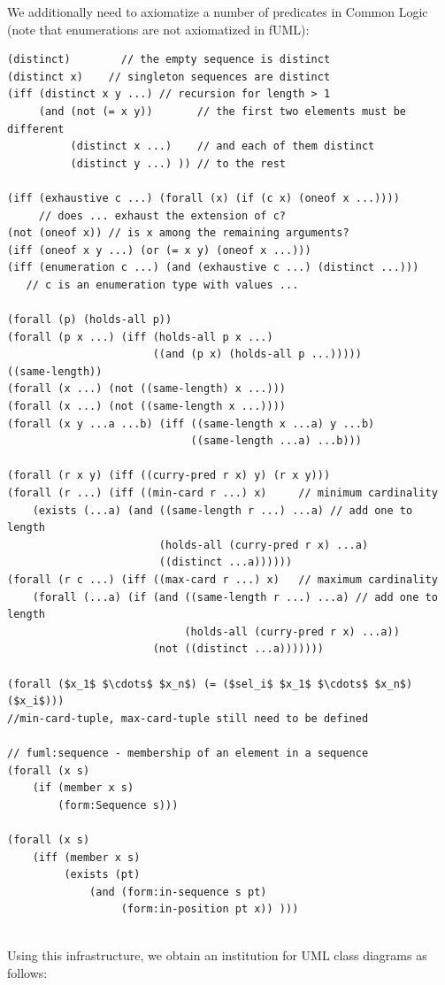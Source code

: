 \documentclass[10pt,fleqn,%
\ifpretendfinal
final%
\else
draft%
\fi,
]{scrreprt}
\begin{document}
We additionally need to axiomatize a number of predicates in Common Logic
(note that enumerations are not axiomatized in fUML):
\begin{lstlisting}[language=clif]
(distinct)        // the empty sequence is distinct
(distinct x)    // singleton sequences are distinct
(iff (distinct x y ...) // recursion for length > 1
     (and (not (= x y))       // the first two elements must be different
          (distinct x ...)    // and each of them distinct
          (distinct y ...) )) // to the rest

(iff (exhaustive c ...) (forall (x) (if (c x) (oneof x ...))))
     // does ... exhaust the extension of c?
(not (oneof x)) // is x among the remaining arguments?
(iff (oneof x y ...) (or (= x y) (oneof x ...)))
(iff (enumeration c ...) (and (exhaustive c ...) (distinct ...)))
   // c is an enumeration type with values ...

(forall (p) (holds-all p))
(forall (p x ...) (iff (holds-all p x ...)
                       ((and (p x) (holds-all p ...)))))
((same-length))
(forall (x ...) (not ((same-length) x ...)))
(forall (x ...) (not ((same-length x ...))))
(forall (x y ...a ...b) (iff ((same-length x ...a) y ...b)
                             ((same-length ...a) ...b)))

(forall (r x y) (iff ((curry-pred r x) y) (r x y)))
(forall (r ...) (iff ((min-card r ...) x)     // minimum cardinality
    (exists (...a) (and ((same-length r ...) ...a) // add one to length
                        (holds-all (curry-pred r x) ...a)
                        ((distinct ...a))))))
(forall (r c ...) (iff ((max-card r ...) x)   // maximum cardinality
    (forall (...a) (if (and ((same-length r ...) ...a) // add one to length
                            (holds-all (curry-pred r x) ...a))
                       (not ((distinct ...a)))))))

(forall ($x_1$ $\cdots$ $x_n$) (= ($sel_i$ $x_1$ $\cdots$ $x_n$) ($x_i$)))
//min-card-tuple, max-card-tuple still need to be defined

// fuml:sequence - membership of an element in a sequence
(forall (x s)
    (if (member x s)
        (form:Sequence s)))

(forall (x s)
    (iff (member x s)
         (exists (pt) 
             (and (form:in-sequence s pt)
                  (form:in-position pt x)) )))


\end{lstlisting}

Using this infrastructure, we obtain an institution for UML class
diagrams as follows:
\end{document}

